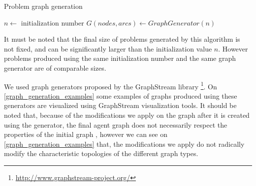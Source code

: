 \begin{algorithm}
\caption{Problem graph generation}
\label{algo_graph_generation}
	$n \leftarrow$ initialization number\;
	$G(nodes, arcs) \leftarrow GraphGenerator(n)$\;
			

\end{algorithm}

It must be noted that the final size of problems generated by this algorithm is not fixed, and can be significantly larger than the initialization value $n$. However problems produced using the same initialization number and the same graph generator are of comparable sizes.

We used graph generators proposed by the GraphStream library \footnote{\url{http://www.graphstream-project.org/}}. On \figurename{} \ref{graph_generation_examples} some examples of graphs produced using these generators are visualized using GraphStream visualization tools. It should be noted that, because of the modifications we apply on the graph after it is created using the generator, the final agent graph does not necessarily respect the properties of the initial graph , however we can see on \figurename{} \ref{graph_generation_examples} that, the modifications we apply do not radically modify the characteristic topologies of the different graph types.
 
